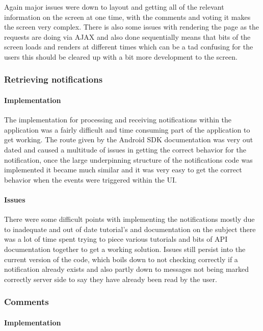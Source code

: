 Again major issues were down to layout and getting all of the relevant information on the screen at one time, with the comments and voting it makes the screen very complex. There is also some issues with rendering the page as the requests are doing via AJAX and also done sequentially means that bits of the screen loads and renders at different times which can be a tad confusing for the users this should be cleared up with a bit more development to the screen.

\subsubsection*{Retrieving notifications}

\paragraph*{Implementation}

The implementation for processing and receiving notifications within the application was a fairly difficult and time consuming part of the application to get working. The route given by the Android SDK documentation was very out dated and caused a multitude of issues in getting the correct behavior for the notification, once the large underpinning structure of the notifications code was implemented it became much similar and it was very easy to get the correct behavior when the events were triggered within the UI.

\paragraph*{Issues}

There were some difficult points with implementing the notifications mostly due to inadequate and out of date tutorial's and documentation on the subject there was a lot of time spent trying to piece various tutorials and bits of API documentation together to get a working solution. Issues still persist into the current version of the code, which boils down to not checking correctly if a notification already exists and also partly down to messages not being marked correctly server side to say they have already been read by the user.

\subsubsection*{Comments}

\paragraph*{Implementation}

